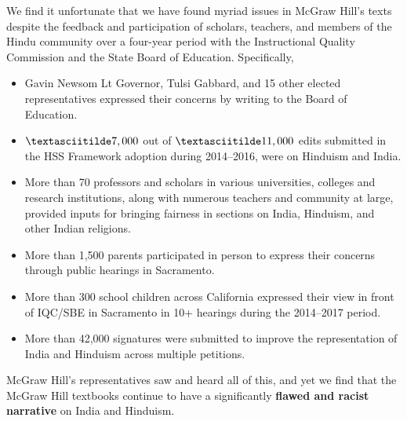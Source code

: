 We find it unfortunate that we have found myriad issues in McGraw Hill’s texts despite the feedback and participation of scholars, teachers, and members of the Hindu community over a four-year period with the Instructional Quality Commission and the State Board of Education. Specifically, 
\begin{itemize} 
\item Gavin Newsom Lt Governor, Tulsi Gabbard, and 15 other elected representatives expressed their concerns by writing to the Board of Education.
\item $\textasciitilde 7,000$ out of $\textasciitilde 11,000$ edits submitted in the HSS Framework adoption during 2014--2016, were on Hinduism and India.
\item More than 70 professors and scholars in various universities, colleges and research institutions, along with numerous teachers and community at large, provided inputs for bringing fairness in sections on India, Hinduism, and other Indian religions.
\item More than 1,500 parents participated in person to express their concerns through public hearings in Sacramento.
\item More than 300 school children across California expressed their view in front of IQC/SBE in Sacramento in 10+ hearings during the 2014--2017 period.
\item More than 42,000 signatures were submitted to improve the representation of India and Hinduism across multiple petitions.
\end{itemize}
McGraw Hill’s representatives saw and heard all of this, and yet we find that the McGraw Hill textbooks continue to have a significantly \textbf{flawed and racist narrative} on India and Hinduism.

